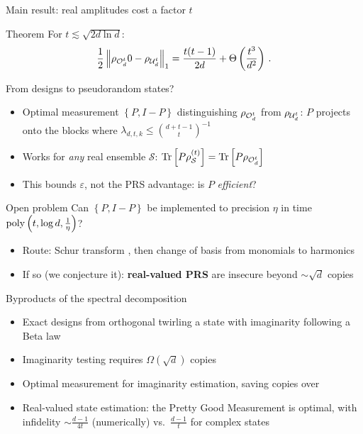 \documentclass[aspectratio=169]{beamer}
\newcommand{\scite}[1]{{\tiny\citep{#1}}}
\begin{document}
\begin{frame}{Main result: real amplitudes cost a factor $t$}
	\begin{block}{Theorem}
		For $t\lesssim\sqrt{2d\ln d}$:
        \[\frac12\left\|\rho_{\mathcal{O}_{d}^{t}}{0}-\rho_{\mathcal{U}_{d}^{t}}\right\|_1=\frac{t(t-1)}{2d}+\Theta\left(\frac{t^3}{d^2}\right)\,.\]
	\end{block}
\end{frame}

\begin{frame}{From designs to pseudorandom states?}
	\small
	\begin{itemize}
		\item Optimal measurement $\left\{P,I-P\right\}$ distinguishing $\rho_{\mathcal{O}_{d}^{t}}$ from $\rho_{\mathcal{U}_{d}^{t}}$: $P$ projects onto the blocks where $\lambda_{d,t,k}\leqslant\binom{d+t-1}{t}^{-1}$\pause
		\item Works for \emph{any} real ensemble $\mathcal{S}$: $\operatorname{Tr}\left[P\rho_{\mathcal{S}}^{(t)}\right]=\operatorname{Tr}\left[P\rho_{\mathcal{O}_{d}^{t}}\right]$\pause
		\item This bounds $\varepsilon$, not the PRS advantage: is $P$ \emph{efficient}?
	\end{itemize}
	\pause
	\begin{block}{Open problem}
		Can $\left\{P,I-P\right\}$ be implemented to precision $\eta$ in time $\mathrm{poly}\left(t,\log d,\frac{1}{\eta}\right)$?
	\end{block}
	\pause
	\begin{itemize}
		\item Route: Schur transform \scite{Bur+25}, then change of basis from monomials to harmonics\pause
		\item If so (we conjecture it): \textbf{real-valued PRS} are insecure beyond $\sim\sqrt{d}$ copies
	\end{itemize}
\end{frame}

\begin{frame}{Byproducts of the spectral decomposition}
	\begin{itemize}
		\item Exact designs from orthogonal twirling a state with imaginarity following a Beta law\pause
		\item Imaginarity testing requires $\Omega\left(\sqrt{d}\right)$ copies\pause
		\item Optimal measurement for imaginarity estimation, saving copies over \scite{HBK25}\pause
		\item Real-valued state estimation: the Pretty Good Measurement is optimal, with infidelity $\sim\frac{d-1}{4t}$ (numerically) vs.\ $\frac{d-1}{t}$ for complex states
	\end{itemize}
\end{frame}
\end{document}
